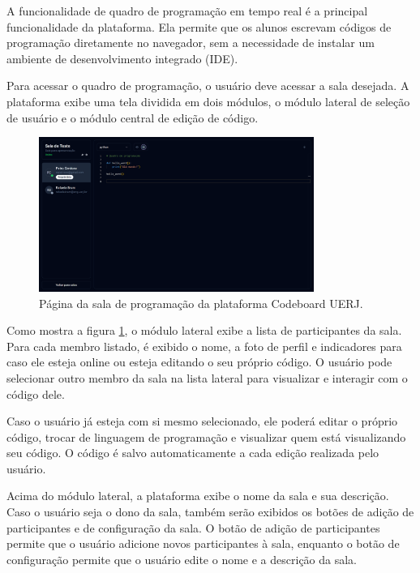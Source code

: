 A funcionalidade de quadro de programação em tempo real é a principal funcionalidade da plataforma. Ela permite que os alunos escrevam códigos de programação diretamente no navegador, sem a necessidade de instalar um ambiente de desenvolvimento integrado (IDE).

Para acessar o quadro de programação, o usuário deve acessar a sala desejada. A plataforma exibe uma tela dividida em dois módulos, o módulo lateral de seleção de usuário e o módulo central de edição de código.

\begin{figure}[H]
    \centering
    \includegraphics[width=0.8\textwidth]{assets/codeboard/room-details-page.png}
    \caption{Página da sala de programação da plataforma Codeboard UERJ.}
    \label{fig:room-details-page}
\end{figure}


Como mostra a figura \ref{fig:room-details-page}, o módulo lateral exibe a lista de participantes da sala. Para cada membro listado, é exibido o nome, a foto de perfil e indicadores para caso ele esteja online ou esteja editando o seu próprio código. O usuário pode selecionar outro membro da sala na lista lateral para visualizar e interagir com o código dele.

Caso o usuário já esteja com si mesmo selecionado, ele poderá editar o próprio código, trocar de linguagem de programação e visualizar quem está visualizando seu código. O código é salvo automaticamente a cada edição realizada pelo usuário.

Acima do módulo lateral, a plataforma exibe o nome da sala e sua descrição. Caso o usuário seja o dono da sala, também serão exibidos os botões de adição de participantes e de configuração da sala. O botão de adição de participantes permite que o usuário adicione novos participantes à sala, enquanto o botão de configuração permite que o usuário edite o nome e a descrição da sala.

